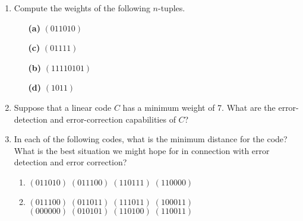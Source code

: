 {\begin{enumerate}
 
 
 
\item  %
Compute the weights of the following $n$-tuples.
 
\vspace{3pt}        %
 
\hspace{-7pt}
\begin{minipage}[t]{4.6in}
\noindent
\begin{minipage}[t]{2.25in}
\begin{itemize}
 
 \item[{\bf (a)}]
$(011010)$
 
 \item[{\bf (c)}]
$(01111)$
 
\end{itemize}
\end{minipage} \hfill
\begin{minipage}[t]{2.25in}
\begin{itemize}
 
 \item[{\bf (b)}]
$(11110101)$
 
 \item[{\bf (d)}]
$(1011)$
 
\end{itemize}
\end{minipage}
\end{minipage}
 
\vspace{2pt}        %
 
 
 
\item  %
Suppose that a linear code $C$ has a minimum weight of 7. What are the
error-detection and error-correction capabilities of $C$?
 
 
\item
In each of the following codes, what is the minimum distance for the
code? What is the best situation we might hope for in connection with
error detection and error correction? 
\begin{enumerate}
 
 \item
$(011010) \; (011100) \; (110111) \; (110000)$
 
 \item
$(011100) \; (011011) \; (111011) \; (100011)$ \\
$(000000) \; (010101) \; (110100) \; (110011)$
 

\end{enumerate}
\end{enumerate}}
